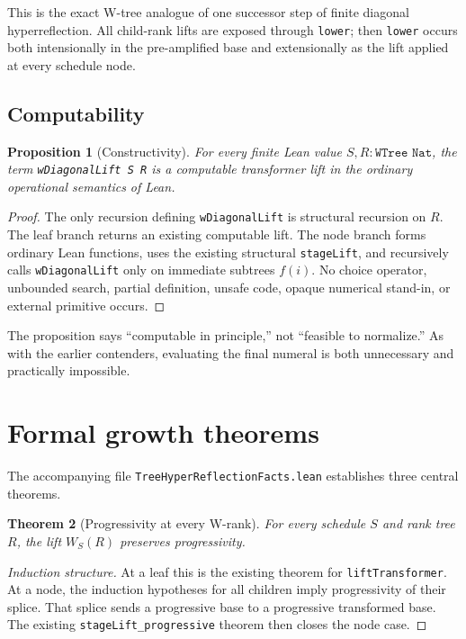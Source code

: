 \documentclass[11pt]{article}
\newtheorem{theorem}{Theorem}[section]
\newtheorem{proposition}[theorem]{Proposition}
\theoremstyle{definition}
\newcommand{\code}[1]{\texttt{#1}}
\begin{document}
This is the exact W-tree analogue of one successor step of finite diagonal
hyperreflection.  All child-rank lifts are exposed through \code{lower}; then
\code{lower} occurs both intensionally in the pre-amplified base and
extensionally as the lift applied at every schedule node.

\subsection{Computability}

\begin{proposition}[Constructivity]
For every finite Lean value \(S,R:\code{WTree Nat}\), the term
\code{wDiagonalLift S R} is a computable transformer lift in the ordinary
operational semantics of Lean.
\end{proposition}

\begin{proof}
The only recursion defining \code{wDiagonalLift} is structural recursion on
\(R\).  The leaf branch returns an existing computable lift.  The node branch
forms ordinary Lean functions, uses the existing structural
\code{stageLift}, and recursively calls \code{wDiagonalLift} only on immediate
subtrees \(f(i)\).  No choice operator, unbounded search, partial definition,
unsafe code, opaque numerical stand-in, or external primitive occurs.
\end{proof}

The proposition says ``computable in principle,'' not ``feasible to
normalize.''  As with the earlier contenders, evaluating the final numeral is
both unnecessary and practically impossible.

\section{Formal growth theorems}

The accompanying file \code{TreeHyperReflectionFacts.lean} establishes three
central theorems.

\begin{theorem}[Progressivity at every W-rank]
For every schedule \(S\) and rank tree \(R\), the lift \(W_S(R)\) preserves
progressivity.
\end{theorem}

\begin{proof}[Induction structure]
At a leaf this is the existing theorem for \code{liftTransformer}.  At a node,
the induction hypotheses for all children imply progressivity of their splice.
That splice sends a progressive base to a progressive transformed base.  The
existing \code{stageLift\_progressive} theorem then closes the node case.
\end{proof}
\end{document}
